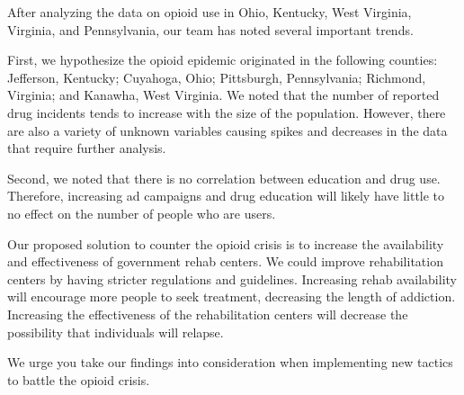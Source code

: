\documentclass[12pt,stdletter,orderfromtodate,sigleft]{newlfm}
\begin{document}
\begin{newlfm}

After analyzing the data on opioid use in Ohio, Kentucky, West Virginia, Virginia, and Pennsylvania, our team has noted several important trends. 

First, we hypothesize the opioid epidemic originated in the following counties: Jefferson, Kentucky; Cuyahoga, Ohio; Pittsburgh, Pennsylvania; Richmond, Virginia; and Kanawha, West Virginia. We noted that the number of reported drug incidents tends to increase with the size of the population. However, there are also a variety of unknown variables causing spikes and decreases in the data that require further analysis.

Second, we noted that there is no correlation between education and drug use. Therefore, increasing ad campaigns and drug education will likely have little to no effect on the number of people who are users. 

Our proposed solution to counter the opioid crisis is to increase the availability and effectiveness of government rehab centers. We could improve rehabilitation centers by having stricter regulations and guidelines. Increasing rehab availability will encourage more people to seek treatment, decreasing the length of addiction. Increasing the effectiveness of the rehabilitation centers will decrease the possibility that individuals will relapse. 

We urge you take our findings into consideration when implementing new tactics to battle the opioid crisis.  

\end{newlfm}
\end{document}
